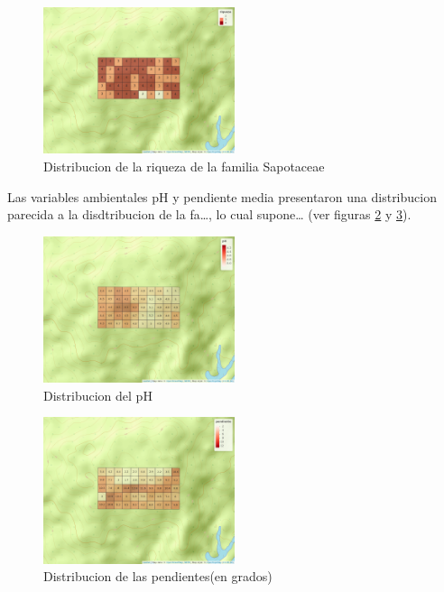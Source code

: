 \documentclass[11pt,]{article}
\begin{document}
\begin{figure}
\centering
\includegraphics[width=0.50000\textwidth]{mapa_cuadros_riq_mi_familia.png}
\caption{Distribucion de la riqueza de la familia
Sapotaceae\label{fig:mapa_cuadros_riq_mi_familia}}
\end{figure}

Las variables ambientales pH y pendiente media presentaron una
distribucion parecida a la disdtribucion de la fa\ldots{}, lo cual
supone\ldots{} (ver figuras \ref{fig:mapa_cuadros_pH} y
\ref{fig:mapa_cuadros_pendiente}).

\begin{figure}
\centering
\includegraphics[width=0.50000\textwidth]{mapa_cuadros_ph.png}
\caption{Distribucion del pH\label{fig:mapa_cuadros_pH}}
\end{figure}

\begin{figure}
\centering
\includegraphics[width=0.50000\textwidth]{mapa_cuadros_pendiente.png}
\caption{Distribucion de las pendientes(en
grados)\label{fig:mapa_cuadros_pendiente}}
\end{figure}
\end{document}
